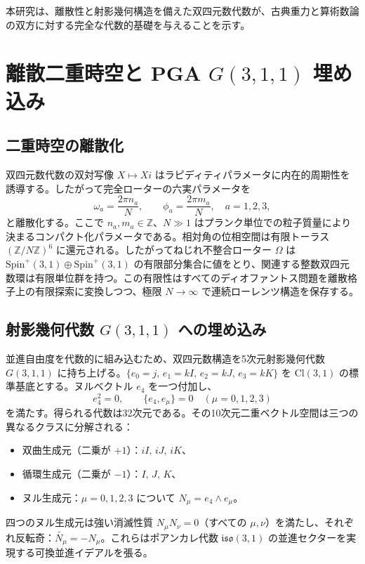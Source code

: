 \documentclass[a4paper]{article}
\theoremstyle{definition}
\begin{document}
本研究は、離散性と射影幾何構造を備えた双四元数代数が、古典重力と算術数論の双方に対する完全な代数的基礎を与えることを示す。

\section{離散二重時空と PGA \texorpdfstring{$G(3,1,1)$}{G(3,1,1)} 埋め込み}

\subsection{二重時空の離散化}

双四元数代数の双対写像 $X \mapsto Xi$ はラピディティパラメータに内在的周期性を誘導する。したがって完全ローターの六実パラメータを
\[
\omega_a = \frac{2\pi n_a}{N}, \qquad \phi_a = \frac{2\pi m_a}{N}, \quad a=1,2,3,
\]
と離散化する。ここで $n_a, m_a \in \mathbb{Z}$、$N \gg 1$ はプランク単位での粒子質量により決まるコンパクト化パラメータである。相対角の位相空間は有限トーラス $(\mathbb{Z}/N\mathbb{Z})^6$ に還元される。したがってねじれ不整合ローター $\Omega$ は $\mathrm{Spin}^+(3,1) \oplus \mathrm{Spin}^+(3,1)$ の有限部分集合に値をとり、関連する整数双四元数環は有限単位群を持つ。この有限性はすべてのディオファントス問題を離散格子上の有限探索に変換しつつ、極限 $N \to \infty$ で連続ローレンツ構造を保存する。

\subsection{射影幾何代数 \texorpdfstring{$G(3,1,1)$}{G(3,1,1)} への埋め込み}

並進自由度を代数的に組み込むため、双四元数構造を5次元射影幾何代数 $G(3,1,1)$ に持ち上げる。$\{e_0 = j,\, e_1 = kI,\, e_2 = kJ,\, e_3 = kK\}$ を $\mathrm{Cl}(3,1)$ の標準基底とする。ヌルベクトル $e_4$ を一つ付加し、
\[
e_4^2 = 0, \qquad \{e_4, e_\mu\} = 0 \quad (\mu = 0,1,2,3)
\]
を満たす。得られる代数は32次元である。その10次元二重ベクトル空間は三つの異なるクラスに分解される：
\begin{itemize}
  \item 双曲生成元（二乗が $+1$）：$iI,\, iJ,\, iK$、
  \item 循環生成元（二乗が $-1$）：$I,\, J,\, K$、
  \item ヌル生成元：$\mu = 0,1,2,3$ について $N_\mu = e_4 \wedge e_\mu$。
\end{itemize}
四つのヌル生成元は強い消滅性質 $N_\mu N_\nu = 0$（すべての $\mu,\nu$）を満たし、それぞれ反転奇：$\widetilde{N_\mu} = -N_\mu$。これらはポアンカレ代数 $\mathfrak{iso}(3,1)$ の並進セクターを実現する可換並進イデアルを張る。
\end{document}
